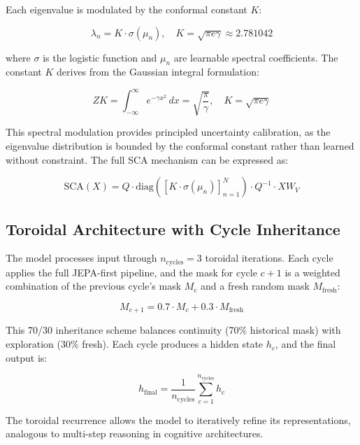 \documentclass[conference]{IEEEtran}
\begin{document}
Each eigenvalue is modulated by the conformal constant $K$:

\begin{equation}
\lambda_n = K \cdot \sigma(\mu_n), \quad K = \sqrt{\pi e \gamma} \approx 2.781042
\end{equation}

where $\sigma$ is the logistic function and $\mu_n$ are learnable spectral coefficients. The constant $K$ derives from the Gaussian integral formulation:

\begin{equation}
ZK = \int_{-\infty}^{\infty} e^{-\gamma x^2}\,dx = \sqrt{\frac{\pi}{\gamma}}, \quad K = \sqrt{\pi e \gamma}
\end{equation}

This spectral modulation provides principled uncertainty calibration, as the eigenvalue distribution is bounded by the conformal constant rather than learned without constraint. The full SCA mechanism can be expressed as:

\begin{equation}
\text{SCA}(X) = Q \cdot \text{diag}\left(\left[K \cdot \sigma(\mu_n)\right]_{n=1}^{N}\right) \cdot Q^{-1} \cdot X W_V
\end{equation}

\subsection{Toroidal Architecture with Cycle Inheritance}

The model processes input through $n_{\text{cycles}} = 3$ toroidal iterations. Each cycle applies the full JEPA-first pipeline, and the mask for cycle $c+1$ is a weighted combination of the previous cycle's mask $M_c$ and a fresh random mask $M_{\text{fresh}}$:

\begin{equation}
M_{c+1} = 0.7 \cdot M_c + 0.3 \cdot M_{\text{fresh}}
\end{equation}

This 70/30 inheritance scheme balances continuity (70\% historical mask) with exploration (30\% fresh). Each cycle produces a hidden state $h_c$, and the final output is:

\begin{equation}
h_{\text{final}} = \frac{1}{n_{\text{cycles}}} \sum_{c=1}^{n_{\text{cycles}}} h_c
\end{equation}

The toroidal recurrence allows the model to iteratively refine its representations, analogous to multi-step reasoning in cognitive architectures.
\end{document}

